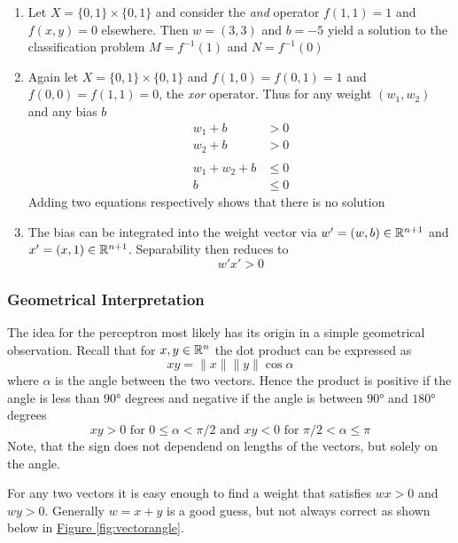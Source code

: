 \begin{examples}\hfill
    \begin{enumerate}
        \item Let \( X = \{ 0, 1 \} \times \{ 0, 1 \} \) and consider the \emph{and} operator 
		    \( f(1, 1) = 1 \) and \( f(x, y) = 0 \) elsewhere. Then \( w = (3, 3) \) and \( b = -5 \) 
			yield a solution to the classification problem \( M = f^{-1}(1) \) and \( N = f^{-1}(0) \)
        \item Again let \( X = \{ 0, 1 \} \times \{ 0, 1 \} \) and \( f(1, 0) = f(0, 1) = 1 \) and 
			\( f(0, 0) = f(1, 1) = 0 \), the \emph{xor} operator. Thus for any weight \( (w_1, w_2) \) and 
			any bias \( b \)
				\[
					\begin{split}
						w_1 + b & > 0 \\ 
						w_2 + b & > 0 \\
						\\
						w_1 + w_2 + b & \le 0 \\
					    b & \le 0
					\end{split}
				\]
			Adding two equations respectively shows that there is no solution
		\item The bias can be integrated into the weight vector via \( w' = (w, b) \in \mathbb{R}^{n + 1} \) and 
			\( x' = (x, 1) \in \mathbb{R}^{n + 1} \). Separability then reduces to
				\[
					w'x' > 0
				\]
	\end{enumerate}
\end{examples}
\bigskip


\subsubsection*{Geometrical Interpretation}
The idea for the perceptron most likely has its origin in a simple geometrical observation.
Recall that for \( x, y \in \mathbb{R}^n \) the dot product can be expressed as 
\[
	xy = \|x\| \|y\| \cos \alpha 
\]
where \( \alpha \) is the angle between the two vectors. Hence the product is positive 
if the angle is less than \( \ang{90} \) degrees and negative if the angle is between \( \ang{90} \) 
and \( \ang{180} \) degrees
\[
	xy > 0 \text{ for } 0 \le \alpha < \pi / 2 \text{ and } xy < 0 \text{ for } \pi / 2 < \alpha \le \pi
\]
Note, that the sign does not dependend on lengths of the vectors, but solely on the angle.

For any two vectors it is easy enough to find a weight that satisfies \( wx > 0 \) and \( wy > 0 \). 
Generally \( w = x + y \) is a good guess, but not always correct as shown below in 
\hyperref[fig:vectorangle]{Figure \ref*{fig:vectorangle}}. 


